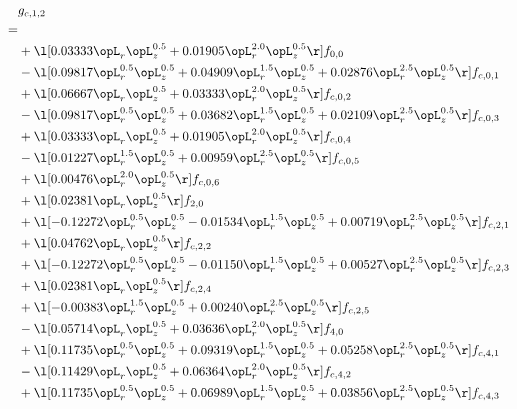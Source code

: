 \begin{alignat}{2} 
\label{eq:g_12_0} 
& g_{c,1,2} \nonumber \\ 
 = \\ 
& + \l[  0.03333 \opL_r \opL_z^{0.5} +  0.01905 \opL_r^{2.0} \opL_z^{0.5}  \r] f_{0,0} \nonumber \\ 
& - \l[  0.09817 \opL_r^{0.5} \opL_z^{0.5} +  0.04909 \opL_r^{1.5} \opL_z^{0.5} +  0.02876 \opL_r^{2.5} \opL_z^{0.5}  \r] f_{c,0,1} \nonumber \\ 
& + \l[  0.06667 \opL_r \opL_z^{0.5} +  0.03333 \opL_r^{2.0} \opL_z^{0.5}  \r] f_{c,0,2} \nonumber \\ 
& - \l[  0.09817 \opL_r^{0.5} \opL_z^{0.5} +  0.03682 \opL_r^{1.5} \opL_z^{0.5} +  0.02109 \opL_r^{2.5} \opL_z^{0.5}  \r] f_{c,0,3} \nonumber \\ 
& + \l[  0.03333 \opL_r \opL_z^{0.5} +  0.01905 \opL_r^{2.0} \opL_z^{0.5}  \r] f_{c,0,4} \nonumber \\ 
& - \l[  0.01227 \opL_r^{1.5} \opL_z^{0.5} +  0.00959 \opL_r^{2.5} \opL_z^{0.5}  \r] f_{c,0,5} \nonumber \\ 
& + \l[  0.00476 \opL_r^{2.0} \opL_z^{0.5}  \r] f_{c,0,6} \nonumber \\ 
& + \l[  0.02381 \opL_r \opL_z^{0.5}  \r] f_{2,0} \nonumber \\ 
& + \l[  -0.12272 \opL_r^{0.5} \opL_z^{0.5}   -0.01534 \opL_r^{1.5} \opL_z^{0.5} +  0.00719 \opL_r^{2.5} \opL_z^{0.5}  \r] f_{c,2,1} \nonumber \\ 
& + \l[  0.04762 \opL_r \opL_z^{0.5}  \r] f_{c,2,2} \nonumber \\ 
& + \l[  -0.12272 \opL_r^{0.5} \opL_z^{0.5}   -0.01150 \opL_r^{1.5} \opL_z^{0.5} +  0.00527 \opL_r^{2.5} \opL_z^{0.5}  \r] f_{c,2,3} \nonumber \\ 
& + \l[  0.02381 \opL_r \opL_z^{0.5}  \r] f_{c,2,4} \nonumber \\ 
& + \l[  -0.00383 \opL_r^{1.5} \opL_z^{0.5} +  0.00240 \opL_r^{2.5} \opL_z^{0.5}  \r] f_{c,2,5} \nonumber \\ 
& - \l[  0.05714 \opL_r \opL_z^{0.5} +  0.03636 \opL_r^{2.0} \opL_z^{0.5}  \r] f_{4,0} \nonumber \\ 
& + \l[  0.11735 \opL_r^{0.5} \opL_z^{0.5} +  0.09319 \opL_r^{1.5} \opL_z^{0.5} +  0.05258 \opL_r^{2.5} \opL_z^{0.5}  \r] f_{c,4,1} \nonumber \\ 
& - \l[  0.11429 \opL_r \opL_z^{0.5} +  0.06364 \opL_r^{2.0} \opL_z^{0.5}  \r] f_{c,4,2} \nonumber \\ 
& + \l[  0.11735 \opL_r^{0.5} \opL_z^{0.5} +  0.06989 \opL_r^{1.5} \opL_z^{0.5} +  0.03856 \opL_r^{2.5} \opL_z^{0.5}  \r] f_{c,4,3} \nonumber \\ 

\end{alignat}
